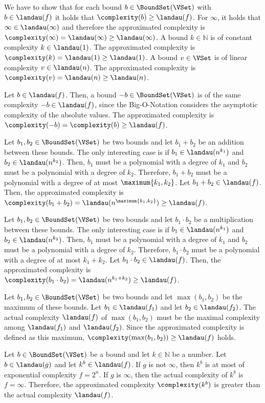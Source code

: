 We have to show that for each bound $b \in \BoundSet(\VSet)$ with $b \in \landau(f)$ it holds that $\complexity(b) \geq \landau(f)$.
For $\infty$, it holds that $\infty \in \landau(\infty)$ and therefore the approximated complexity is $\complexity(\infty) = \landau(\infty) \geq \landau(\infty)$.
A bound $k \in \mathbb{N}$ is of constant complexity $k \in \landau(1)$.
The approximated complexity is $\complexity(k) = \landau(1) \geq \landau(1)$.
A bound $v \in \VSet$ is of linear complexity $v \in \landau(n)$.
The approximated complexity is $\complexity(v) = \landau(n) \geq \landau(n)$.

Let $b \in \landau(f)$.
Then, a bound $-b \in \BoundSet(\VSet)$ is of the same complexity $-b \in \landau(f)$, since the Big-O-Notation considers the asymptotic complexity of the absolute values.
The approximated complexity is $\complexity(-b) = \complexity(b) \geq \landau(f)$.

Let $b_1, b_2 \in \BoundSet(\VSet)$ be two bounds and let $b_1 + b_2$ be an addition between these bounds.
The only interesting case is if $b_1 \in \landau(n^{k_1})$ and $b_2 \in \landau(n^{k_2})$.
Then, $b_1$ must be a polynomial with a degree of $k_1$ and $b_2$ must be a polynomial with a degree of $k_2$.
Therefore, $b_1 + b_2$ must be a polynomial with a degree of at most $\maximum{k_1,k_2}$.
Let $b_1 + b_2 \in \landau(f)$.
Then, the approximated complexity is $\complexity(b_1 + b_2) = \landau(n^{\maximum{k_1,k_2}}) \geq \landau(f)$.

Let $b_1, b_2 \in \BoundSet(\VSet)$ be two bounds and let $b_1 \cdot b_2$ be a multiplication between these bounds.
The only interesting case is if $b_1 \in \landau(n^{k_1})$ and $b_2 \in \landau(n^{k_2})$.
Then, $b_1$ must be a polynomial with a degree of $k_1$ and $b_2$ must be a polynomial with a degree of $k_2$.
Therefore, $b_1 \cdot b_2$ must be a polynomial with a degree of at most $k_1 + k_2$.
Let $b_1 \cdot b_2 \in \landau(f)$.
Then, the approximated complexity is $\complexity(b_1 \cdot b_2) = \landau(n^{k_1 + k_2}) \geq \landau(f)$.

Let $b_1, b_2 \in \BoundSet(\VSet)$ be two bounds and let $\max(b_1,b_2)$ be the maximum of these bounds.
Let $b_1 \in \landau(f_1)$ and let $b_2 \in \landau(f_2)$.
The actual complexity $\landau(f)$ of $\max(b_1,b_2)$ must be the maximal complexity among $\landau(f_1)$ and $\landau(f_2)$.
Since the approximated complexity is defined as this maximum, $\complexity(\max(b_1,b_2)) \geq \landau(f)$ holds.

Let $b \in \BoundSet(\VSet)$ be a bound and let $k \in \mathbb{N}$ be a number.
Let $b \in \landau(g)$ and let $k^b \in \landau(f)$.
If $g$ is not $\infty$, then $k^b$ is at most of exponential complexity $f = 2^n$.
If $g$ is $\infty$, then the actual complexity of $k^b$ is $f = \infty$. 
Therefore, the approximated complexity $\complexity(k^b)$ is greater than the actual complexity $\landau(f)$.
